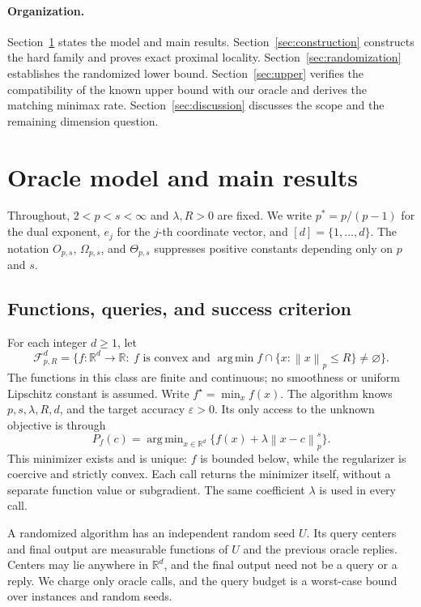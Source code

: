 \documentclass[11pt]{article}
\theoremstyle{definition}
\theoremstyle{remark}
\newcommand{\R}{\mathbb R}
\newcommand{\eps}{\varepsilon}
\newcommand{\norm}[1]{\left\lVert#1\right\rVert}
\newcommand{\F}{\mathcal F}
\DeclareMathOperator*{\argmin}{arg\,min}
\begin{document}
\paragraph{Organization.}
Section~\ref{sec:model} states the model and main results.
Section~\ref{sec:construction} constructs the hard family and proves
exact proximal locality. Section~\ref{sec:randomization} establishes
the randomized lower bound. Section~\ref{sec:upper} verifies the
compatibility of the known upper bound with our oracle and derives the
matching minimax rate. Section~\ref{sec:discussion} discusses the scope
and the remaining dimension question.

\section{Oracle model and main results}\label{sec:model}

Throughout, $2<p<s<\infty$ and $\lambda,R>0$ are fixed.
We write $p^*=p/(p-1)$ for the dual exponent, $e_j$ for the $j$-th
coordinate vector, and $[d]=\{1,\ldots,d\}$.
The notation $O_{p,s}$, $\Omega_{p,s}$, and $\Theta_{p,s}$ suppresses
positive constants depending only on $p$ and $s$.

\subsection{Functions, queries, and success criterion}

For each integer $d\ge1$, let
\begin{equation}\label{eq:function-class}
\F_{p,R}^{d}
=\bigl\{f:\R^d\to\R:\ f\text{ is convex and }
\argmin f\cap\{x:\norm{x}_p\le R\}\ne\varnothing\bigr\}.
\end{equation}
The functions in this class are finite and continuous; no smoothness or
uniform Lipschitz constant is assumed. Write $f^\star=\min_x f(x)$.
The algorithm knows $p,s,\lambda,R,d$, and the target accuracy $\eps>0$.
Its only access to the unknown objective is through
\begin{equation}\label{eq:oracle}
P_f(c)=\argmin_{x\in\R^d}
\bigl\{f(x)+\lambda\norm{x-c}_p^s\bigr\}.
\end{equation}
This minimizer exists and is unique: $f$ is bounded below, while the
regularizer is coercive and strictly convex. Each call returns the
minimizer itself, without a separate function value or subgradient.
The same coefficient $\lambda$ is used in every call.

A randomized algorithm has an independent random seed $U$. Its query
centers and final output are measurable functions of $U$ and the
previous oracle replies. Centers may lie anywhere in $\R^d$, and the
final output need not be a query or a reply. We charge only oracle
calls, and the query budget is a worst-case bound over instances and
random seeds.
\end{document}
